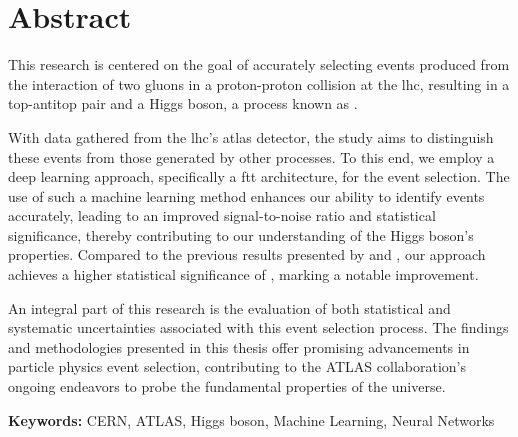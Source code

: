 \chapter*{Abstract}

This research is centered on the goal of accurately selecting events produced from the interaction of two gluons in a
proton-proton collision at the \acrshort{lhc}, resulting in a top-antitop pair and a Higgs boson, a process known as \tth.

With data gathered from the \acrshort{lhc}'s \acrshort{atlas} detector, the study aims to distinguish these \tth events
from those generated by other processes. To this end, we employ a deep learning approach, specifically a \acrshort{ftt}
architecture, for the event selection. The use of such a machine learning method enhances our ability to identify \tth
events accurately, leading to an improved signal-to-noise ratio and statistical significance, thereby contributing to
our understanding of the Higgs boson's properties. Compared to the previous results presented by \cite{severin} and
\cite{jan}, our approach achieves a higher statistical significance of , marking a notable improvement.

An integral part of this research is the evaluation of both statistical and systematic uncertainties associated with
this event selection process. The findings and methodologies presented in this thesis offer promising advancements in
particle physics event selection, contributing to the ATLAS collaboration's ongoing endeavors to probe the fundamental
properties of the universe.

\vspace{3mm}
\noindent
\textbf{Keywords:}
CERN, ATLAS, Higgs boson, Machine Learning, Neural Networks